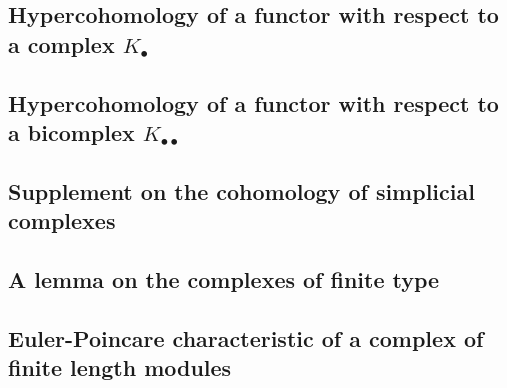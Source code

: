 \subsection{Hypercohomology of a functor with respect to a complex $K_{\bullet}$}
\label{subsection:0.11.6}

\subsection{Hypercohomology of a functor with respect to a bicomplex $K_{\bullet\bullet}$}
\label{subsection:0.11.7}

\subsection{Supplement on the cohomology of simplicial complexes}
\label{subsection:0.11.8}

\subsection{A lemma on the complexes of finite type}
\label{subsection:0.11.9}

\subsection{Euler-Poincare characteristic of a complex of finite length modules}
\label{subsection:0.11.10}